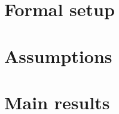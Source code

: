 \documentclass[11pt]{article}
\theoremstyle{definition}
\theoremstyle{plain}
\theoremstyle{remark}
\begin{document}
\section{Formal setup}

\section{Assumptions}

\section{Main results}
\end{document}
